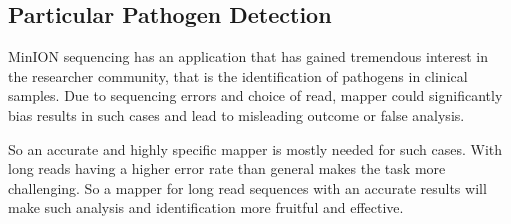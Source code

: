 \documentclass{standalone}
\begin{document}
\subsection{Particular Pathogen Detection}
MinION\cite{minion} sequencing has an application that has gained tremendous interest in the researcher community, that is the identification of pathogens\cite{GraphMap} in clinical samples. Due to sequencing
errors and choice of read, mapper could significantly bias results in such cases and lead to misleading outcome or false analysis.
\par 
So an accurate and highly specific mapper is mostly needed for such cases. With long reads having a higher error rate than general makes the task more challenging. So a mapper for long read sequences with an accurate results will make such analysis and identification more fruitful and effective. 
\end{document}
